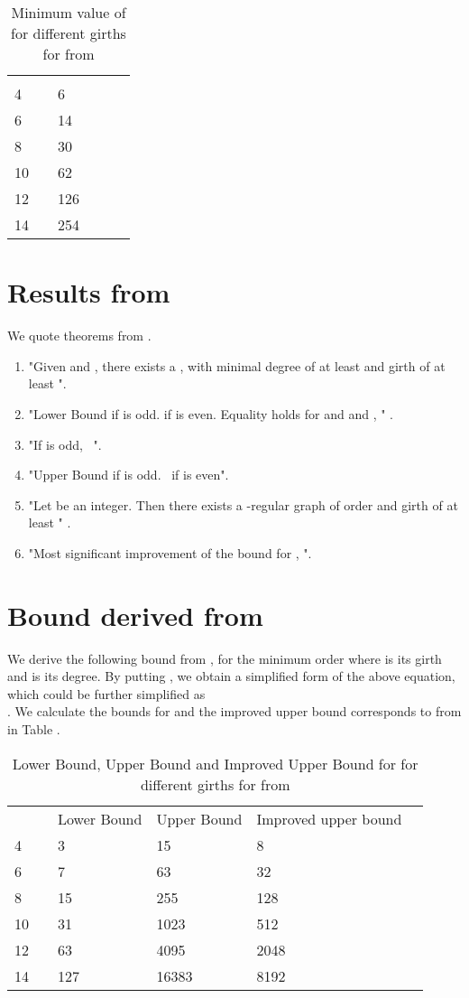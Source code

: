 \documentclass{llncs}
\begin{document}
\begin{table}
\caption{Minimum value of  for different girths  for  from  }
\begin{tabular}{llllll}
\hline\noalign{\smallskip}
 &&   \\
\noalign{\smallskip}
\hline
\noalign{\smallskip}
4 && 6   \\
6 && 14\\
8 && 30  \\
10 && 62  \\
12 && 126  \\
14 && 254 \\
\hline
\end{tabular}
\end{table}

\section {Results from }
We quote theorems from   .
\begin{enumerate}
\item "Given   and   , there exists a ,   with minimal degree of at least  and girth of at least  ".
\item "Lower Bound  if   is odd. 
   if   is even. 
Equality holds for   and   and  ,  " .
\item "If  is odd, \  ".
\item "Upper Bound   if   is odd. 
\   if   is even". 
\item "Let   be an integer. Then there exists a   {}-regular graph of order  and girth of at least  " .
\item "Most significant improvement of the bound for   ,  ".
\end{enumerate}

\section {Bound derived from }
We derive the following bound from  ,  for the minimum order  where  is its girth and  is its degree. By putting  , we obtain a simplified form of the above equation,  which could be further simplified as \\ .
We calculate the bounds for  and the improved upper bound corresponds to  from  in Table . 

\begin{table}
\caption{Lower Bound, Upper Bound and Improved Upper Bound for  for different girths  for  from  }
\begin{tabular}{llllll}
\hline\noalign{\smallskip}
 && Lower Bound  & Upper Bound  & Improved upper bound  \\
\noalign{\smallskip}
\hline
\noalign{\smallskip}
4 && 3  & 15 & 8 \\
6 && 7 & 63  & 32\\
8 && 15 & 255 & 128  \\
10 && 31  & 1023 & 512\\
12 && 63 & 4095 & 2048 \\
14 && 127 & 16383 & 8192  \\
\hline
\end{tabular}
\end{table}
\end{document}
